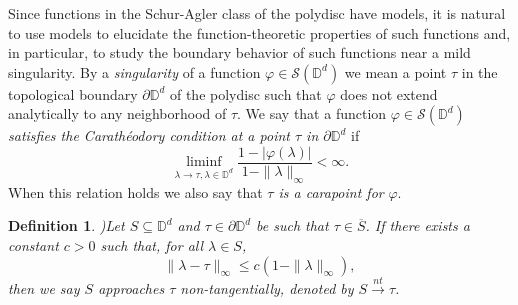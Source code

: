 \documentclass[11pt, reqno]{amsart}
\newtheorem{definition}[theorem]{Definition}
\newcommand\1{\boldsymbol {1}}
\newcommand\be{\begin{equation}}
\newcommand\ee{\end{equation}}
\newcommand\lam{\lambda}
\newcommand{\D}{\mathbb{D}}
\newcommand{\ph}{\varphi}
\numberwithin{equation}{section}
\begin{document}
Since functions in the Schur-Agler class of the polydisc have models, 
it is natural to use models to elucidate the function-theoretic properties of such functions and, in particular, to study the boundary behavior of such functions near a mild singularity.   By a {\em singularity} of a function $\ph\in\mathcal{S}(\D^d)$ we mean a point $\tau$ in the topological boundary $\partial \D^d$ of the polydisc such that $\ph$ does not extend analytically to any neighborhood of $\tau$.  We say that  a function $\ph\in\mathcal{S}(\D^d)$ {\em satisfies the Carath\'eodory condition at a point $\tau$ in $\partial \D^d$ } if
\be \label{Carapoint}
\liminf_{\lam \to \tau, \lam \in \D^d} \frac{1-|\ph(\lam)|}{1-\|\lam\|_\infty} < \infty.
\ee
When this relation holds we also say that {\em $\tau$ is a carapoint for} $\ph$.
\begin{definition}{)}\label{nontangetniallimitonDd-intro}
Let $S\subseteq \mathbb{D}^{d}$ and $\tau \in \partial\mathbb{D}^{d}$ be such that $\tau \in \overline{S}$. If there exists a constant $c>0$ such that, for all $\lambda \in S$,
$$ \|\lambda - \tau \|_{\infty}\leq c ( 1 - \|\lambda\|_{\infty}),$$
then we say $S$ approaches $\tau$ non-tangentially, denoted by $S {\overset{nt}\rightarrow}\tau$.
\end{definition}
\end{document}
